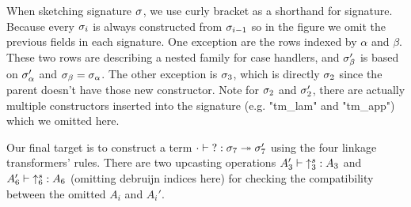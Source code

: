 When sketching signature $\sigma$, we use curly bracket as a shorthand for signature. Because every $\sigma_i$ is always constructed from $\sigma_{i-1}$ so in the figure we omit the previous fields in each signature.  One exception are the rows indexed by $\alpha$ and $\beta$. These two rows are describing a nested family for case handlers, and $\sigma_\beta'$ is based on $\sigma_\alpha'$ and $\sigma_\beta = \sigma_\alpha$. The other exception is $\sigma_3$, which is directly $\sigma_2$ since the parent doesn't have those new constructor. Note for $\sigma_2$ and $\sigma_2'$, there are actually multiple constructors inserted into the signature (e.g. "tm_lam" and "tm_app") which we omitted here.


Our final target is to construct a term $ {\cdot} \vdash {?} : {\sigma_7} \twoheadrightarrow {\ensuremath{\sigma}_7'}$ using the four linkage transformers' rules. There are two upcasting operations $ {A_3'} \vdash {\uparrow^s_3} : {A_3} $ and $ {A_6'} \vdash {\uparrow^s_6} : {A_6} $ (omitting debruijn indices here) for checking the compatibility between the omitted $A_i$ and $A_i'$.
